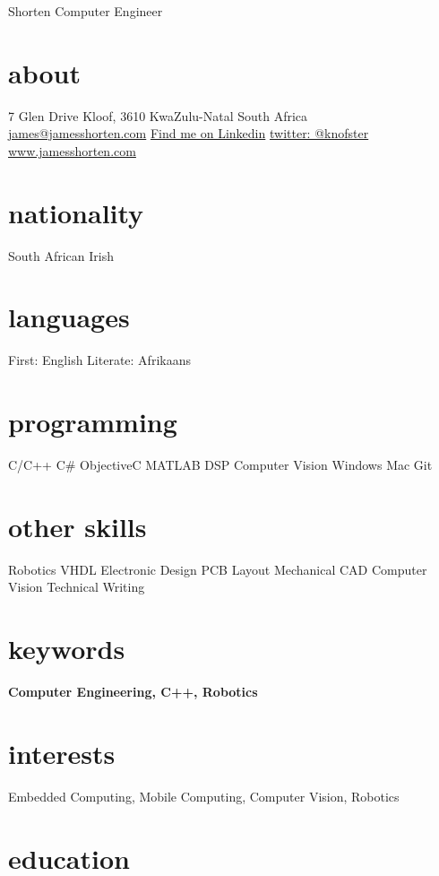 \documentclass[a4paper]{friggeri-cv}
\begin{document}
 { Shorten}
       {Computer Engineer}


\begin{aside}
  \section{about}
    7 Glen Drive
    Kloof, 3610
    KwaZulu-Natal
    South Africa 
    ~
    \href{mailto:james@jamesshorten.com}{james@jamesshorten.com}
    \href{http://za.linkedin.com/in/knofst}{Find me on Linkedin}
    \href{https://twitter.com/knofster}{twitter: @knofster}
    \href{www.jamesshorten.com}{www.jamesshorten.com}
    
    \section{nationality}
     South African
     Irish
  \section{languages}
    First: English
    Literate: Afrikaans
  \section{programming}
    C/C++
    C\#
    ObjectiveC
    MATLAB
   	DSP
    Computer Vision
    Windows
   	Mac
  	Git
  \section{other skills}
    Robotics
    VHDL
  	Electronic Design
  	PCB Layout
  	Mechanical CAD
  	Computer Vision
  	Technical Writing
    
\end{aside}

\section{keywords}
\textbf{Computer Engineering, C++, Robotics}
\section{interests}
Embedded Computing, Mobile Computing, Computer Vision, Robotics 

\section{education}
\end{document}
